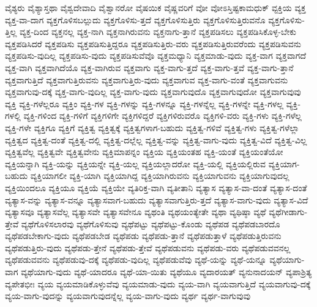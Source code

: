 {ವೈಶ್ಯರು
ವೈಶ್ಯಾಸ್ತಥಾ
ವೈಶ್ವದೇವಾದಿ
ವೈಶ್ವಾನರೋ
ವೈಷಯಿಕ
ವೈಷ್ಣವರಿಗೆ
ವೋ
ವೋಽಸ್ತಿಷ್ಟಕಾಮಧುಕ್
ವ್ಟಕ್ತಿಯ
ವ್ಯಕ್ತ
ವ್ಯಕ್ತ-ವಾ-ದಾಗ
ವ್ಯಕ್ತಗೊಳಿಸಬಲ್ಲುದು
ವ್ಯಕ್ತಗೊಳಿಸು-ತ್ತದೆ
ವ್ಯಕ್ತಗೊಳಿಸುತ್ತಿರು
ವ್ಯಕ್ತಗೊಳಿಸುತ್ತಿರುವನೊ
ವ್ಯಕ್ತಗೊಳಿಸು-ತ್ತಿಲ್ಲ
ವ್ಯಕ್ತ-ದಿಂದ
ವ್ಯಕ್ತನಲ್ಲ
ವ್ಯಕ್ತ-ನಾಗಿ
ವ್ಯಕ್ತನಾಗಿರುವನು
ವ್ಯಕ್ತನಾಗು-ತ್ತಾನೆ
ವ್ಯಕ್ತಪಡಿಸಲು
ವ್ಯಕ್ತಪಡಿಸಿಕೊಳ್ಳ-ಬೇಕು
ವ್ಯಕ್ತಪಡಿಸಿದರೆ
ವ್ಯಕ್ತಪಡಿಸು
ವ್ಯಕ್ತಪಡಿಸುತ್ತಿದ್ದರೂ
ವ್ಯಕ್ತಪಡಿಸುತ್ತಿರು-ವರು
ವ್ಯಕ್ತಪಡಿಸುತ್ತಿರುವರೆಂದು
ವ್ಯಕ್ತಪಡಿಸುವನು
ವ್ಯಕ್ತಪಡಿಸು-ವುದಿಲ್ಲ
ವ್ಯಕ್ತಪಡಿಸು-ವುದು
ವ್ಯಕ್ತಪಡಿಸುವೆವೊ
ವ್ಯಕ್ತಮಧ್ಯಾನಿ
ವ್ಯಕ್ತಮಾಡು-ವುದು
ವ್ಯಕ್ತ-ವಾಗ
ವ್ಯಕ್ತವಾಗದೆ
ವ್ಯಕ್ತ-ವಾಗಿ
ವ್ಯಕ್ತವಾಗಿದೆಯೊ
ವ್ಯಕ್ತ-ವಾಗಿರುವ
ವ್ಯಕ್ತವಾಗು
ವ್ಯಕ್ತ-ವಾಗು-ತ್ತದೆ
ವ್ಯಕ್ತ-ವಾಗು-ತ್ತವೆ
ವ್ಯಕ್ತ-ವಾಗು-ತ್ತಾನೆ
ವ್ಯಕ್ತವಾಗುತ್ತಿದೆ
ವ್ಯಕ್ತವಾಗುತ್ತಿರುವನು
ವ್ಯಕ್ತವಾಗುತ್ತಿರು-ವುದು
ವ್ಯಕ್ತವಾಗುವ
ವ್ಯಕ್ತ-ವಾಗು-ವಂತೆ
ವ್ಯಕ್ತವಾಗುವನು
ವ್ಯಕ್ತವಾಗುವು-ದಕ್ಕೆ
ವ್ಯಕ್ತ-ವಾಗು-ವುದಿಲ್ಲ
ವ್ಯಕ್ತ-ವಾಗು-ವುದು
ವ್ಯಕ್ತವಾಗುವುದೊ
ವ್ಯಕ್ತವಾಗುವುದೋ
ವ್ಯಕ್ತವಾಗುವುವು
ವ್ಯಕ್ತಿ
ವ್ಯಕ್ತಿ-ಗಳೆಲ್ಲರೂ
ವ್ಯಕ್ತಿಂ
ವ್ಯಕ್ತಿ-ಗಳ
ವ್ಯಕ್ತಿ-ಗಳನ್ನು
ವ್ಯಕ್ತಿ-ಗಳನ್ನೂ
ವ್ಯಕ್ತಿ-ಗಳನ್ನೆಲ್ಲ
ವ್ಯಕ್ತಿ-ಗಳನ್ನೇ
ವ್ಯಕ್ತಿ-ಗಳಲ್ಲ
ವ್ಯಕ್ತಿ-ಗಳಲ್ಲಿ
ವ್ಯಕ್ತಿ-ಗಳಿಂದ
ವ್ಯಕ್ತಿ-ಗಳಿಗೆ
ವ್ಯಕ್ತಿಗಳಿಗೇ
ವ್ಯಕ್ತಿಗಳಿದ್ದರೆ
ವ್ಯಕ್ತಿಗಳಿರುವರೊ
ವ್ಯಕ್ತಿಗಳಿ-ವರು
ವ್ಯಕ್ತಿ-ಗಳು
ವ್ಯಕ್ತಿ-ಗಳೆಲ್ಲ
ವ್ಯಕ್ತಿ-ಗಳೇ
ವ್ಯಕ್ತಿಗೂ
ವ್ಯಕ್ತಿಗೆ
ವ್ಯಕ್ತಿತ್ವ
ವ್ಯಕ್ತಿತ್ವಕ್ಕೆ
ವ್ಯಕ್ತಿತ್ವಗಳಾಗ-ಬಹುದು
ವ್ಯಕ್ತಿತ್ವ-ಗಳಿವೆ
ವ್ಯಕ್ತಿತ್ವ-ಗಳು
ವ್ಯಕ್ತಿತ್ವ-ಗಳೆಲ್ಲಾ
ವ್ಯಕ್ತಿತ್ವದ
ವ್ಯಕ್ತಿತ್ವ-ದಂತೆ
ವ್ಯಕ್ತಿತ್ವ-ದಲ್ಲಿ
ವ್ಯಕ್ತಿತ್ವ-ದಲ್ಲೆಲ್ಲ
ವ್ಯಕ್ತಿತ್ವ-ವನ್ನು
ವ್ಯಕ್ತಿತ್ವ-ವಾಗು-ವುದು
ವ್ಯಕ್ತಿತ್ವ-ವಿದೆ
ವ್ಯಕ್ತಿತ್ವ-ವಿಲ್ಲ
ವ್ಯಕ್ತಿತ್ವವೆಲ್ಲ
ವ್ಯಕ್ತಿತ್ವವೇ
ವ್ಯಕ್ತಿತ್ವವೇನು
ವ್ಯಕ್ತಿಮಾಪನ್ನಂ
ವ್ಯಕ್ತಿಯ
ವ್ಯಕ್ತಿಯಂತಹ
ವ್ಯಕ್ತಿ-ಯಂತೆ
ವ್ಯಕ್ತಿಯಂತೆಯೋ
ವ್ಯಕ್ತಿಯನ್ನಾಗಿ
ವ್ಯಕ್ತಿ-ಯನ್ನು
ವ್ಯಕ್ತಿಯನ್ನೇ
ವ್ಯಕ್ತಿ-ಯಲ್ಲ
ವ್ಯಕ್ತಿಯಲ್ಲಾದರೋ
ವ್ಯಕ್ತಿ-ಯಲ್ಲಿ
ವ್ಯಕ್ತಿಯಲ್ಲಿರುವ
ವ್ಯಕ್ತಿಯಾಗ-ಬಹುದು
ವ್ಯಕ್ತಿಯಾಗಲೀ
ವ್ಯಕ್ತಿ-ಯಾಗಿ
ವ್ಯಕ್ತಿಯಾಗಿದ್ದ
ವ್ಯಕ್ತಿಯಾಗಿರುವನು
ವ್ಯಕ್ತಿಯಾಗುವನು
ವ್ಯಕ್ತಿಯಾಗುವುದಲ್ಲ
ವ್ಯಕ್ತಿಯಿಂದಲೂ
ವ್ಯಕ್ತಿಯೂ
ವ್ಯಕ್ತಿಯೆ
ವ್ಯಕ್ತಿಯೇ
ವ್ಯತಿರಿಕ್ತ-ವಾಗಿ
ವ್ಯತೀತಾನಿ
ವ್ಯತ್ಯಾಸ
ವ್ಯತ್ಯಾಸ-ವಾ-ದಂತೆ
ವ್ಯತ್ಯಾಸ-ದಂತೆ
ವ್ಯತ್ಯಾಸ-ವನ್ನು
ವ್ಯತ್ಯಾಸ-ವನ್ನೂ
ವ್ಯತ್ಯಾಸವಾಗ-ಬಹುದು
ವ್ಯತ್ಯಾಸವಾಗುತ್ತಿರು-ತ್ತದೆ
ವ್ಯತ್ಯಾಸ-ವಾಗು-ವುದು
ವ್ಯತ್ಯಾಸ-ವಿದೆ
ವ್ಯತ್ಯಾಸವೂ
ವ್ಯತ್ಯಾಸವೆಲ್ಲ
ವ್ಯತ್ಯಾಸವೇ
ವ್ಯತ್ಯಾಸವೇನೂ
ವ್ಯಥಂತಿ
ವ್ಯಥಯಂತ್ಯೇತೇ
ವ್ಯಥಾ
ವ್ಯಥಿಷ್ಠಾ
ವ್ಯಥೆ
ವ್ಯಥೆಗೀಡಾಗು-ತ್ತೇವೆ
ವ್ಯಥೆಗೊಳಿಸಲಾರವು
ವ್ಯಥೆಗೊಳಿಸುವು
ವ್ಯಥೆಪಟ್ಟು
ವ್ಯಥೆಪಟ್ಟು-ಕೊಂಡು
ವ್ಯಥೆಪಡ
ವ್ಯಥೆಪಡಬಾರದೊ
ವ್ಯಥೆಪಡಬೇಕಾಗು-ವುದು
ವ್ಯಥೆಪಡಬೇಡ
ವ್ಯಥೆಪಡು
ವ್ಯಥೆಪಡು-ತ್ತಾನೆ
ವ್ಯಥೆಪಡುತ್ತಾಳೆ
ವ್ಯಥೆಪಡುತ್ತಿರುವನು
ವ್ಯಥೆಪಡುತ್ತಿರು-ವುದು
ವ್ಯಥೆಪಡು-ತ್ತೇನೆ
ವ್ಯಥೆಪಡು-ತ್ತೇವೆ
ವ್ಯಥೆಪಡುವನು
ವ್ಯಥೆಪಡು-ವರು
ವ್ಯಥೆಪಡುವವನಲ್ಲ
ವ್ಯಥೆಪಡುವವನು
ವ್ಯಥೆಪಡುವು-ದಕ್ಕೆ
ವ್ಯಥೆಪಡು-ವುದಿಲ್ಲ
ವ್ಯಥೆಪಡುವೆವು
ವ್ಯಥೆ-ಯನ್ನು
ವ್ಯಥೆ-ಯನ್ನೂ
ವ್ಯಥೆಯಾಗು-ವಾಗ
ವ್ಯಥೆಯಾಗು-ವುದು
ವ್ಯಥೆ-ಯಾದರೂ
ವ್ಯಥೆ-ಯಾ-ಯಿತು
ವ್ಯಥೆಯೂ
ವ್ಯದಾರಯತ್
ವ್ಯನುನಾದಯನ್
ವ್ಯಪಾಶ್ರಿತ್ಯ
ವ್ಯಪೇತಭೀಃ
ವ್ಯಯ
ವ್ಯಯಮಾಡಿಕೊಳ್ಳುವೆವು
ವ್ಯಯಮಾಡು-ವುದು
ವ್ಯಯ-ವಾಗಿ
ವ್ಯಯವಾಗುತ್ತಿದೆ
ವ್ಯಯವಾಗುವು-ದಕ್ಕೆ
ವ್ಯಯ-ವಾಗು-ವುದನ್ನು
ವ್ಯಯವಾಗುವುದನ್ನೆಲ್ಲ
ವ್ಯಯ-ವಾಗು-ವುದು
ವ್ಯರ್ಥ
ವ್ಯರ್ಥ-ವಾಗುವುವು
}
